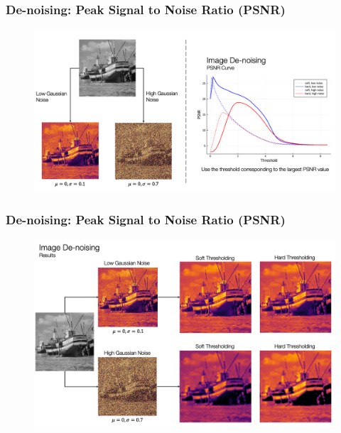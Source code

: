 \documentclass[aspectratio=169]{beamer}
\begin{document}
\begin{frame}
\frametitle{De-noising: Peak Signal to Noise Ratio (PSNR)}
    \begin{figure}
        \centering
        \includegraphics[height=0.85\textheight, keepaspectratio]{psnr_curve.png}
    \end{figure}
\end{frame}

\begin{frame}
\frametitle{De-noising: Peak Signal to Noise Ratio (PSNR)}
    \begin{figure}
        \centering
        \includegraphics[height=0.85\textheight, keepaspectratio]{denoising_result.png}
    \end{figure}
\end{frame}
\end{document}
